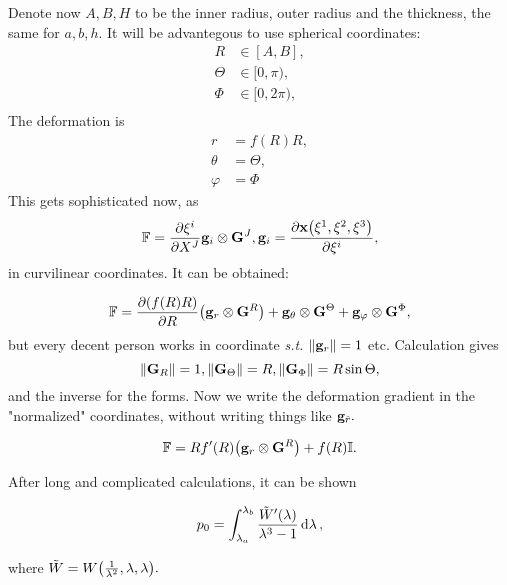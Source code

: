 \documentclass[reqno, a4paper]{article}
\begin{document}
Denote now $A,B,H$ to be the inner radius, outer radius and the thickness, the same for $a,b,h.$ It will be advantegous to use spherical coordinates:
\begin{align*}
	R &\in [A,B],\\
	\Theta &\in [0, \pi), \\
	\Phi &\in [0, 2 \pi), \\
\end{align*}
The deformation is 
\begin{align*}
	r &= f(R) R, \\
	\theta &= \Theta, \\
	\varphi &= \Phi
\end{align*}
This gets sophisticated now, as
\[
	\mathbb{F} = \pdv{\xi^i}{X^J}\vb{g}_i \otimes \vb{G}^J, \vb{g}_i = \pdv{\vb{x}\qty(\xi^1, \xi^2, \xi^3)}{\xi^i},
\]
in curvilinear coordinates. It can be obtained:

\[
	\mathbb{F} = \pdv{\qty(f(R)R)}{R} \qty(\vb{g}_r \otimes \vb{G}^R) + \vb{g}_{\theta}\otimes \vb{G}^{\Theta} + \vb{g}_{\varphi}\otimes \vb{G}^{\Phi},
\]
but every decent person works in coordinate \textit{s.t.} $\norm{\vb{g}_r} = 1$ etc. Calculation gives
\[
	\norm{\vb{G}_R} = 1, \norm{\vb{G}_{\Theta}} = R, \norm{\vb{G}_{\Phi}} = R \sin \Theta,
\]
and the inverse for the forms. Now we write the deformation gradient in the "normalized" coordinates, without writing things like $\vb{g}_{\hat{r}}.$

\[
	\mathbb{F} = R f'(R)\qty(\vb{g}_r \otimes \vb{G}^R)+ f(R)\mathbb{I}.
\]

After long and complicated calculations, it can be shown

\[
	p_0 = \int_{\lambda_a}^{\lambda_b} \frac{\tilde{W}'\qty(\lambda)}{\lambda^{3}-1} \dd{\lambda},
\]

where $\tilde{W} = W\qty(\frac{1}{\lambda^{2}}, \lambda, \lambda).$
\end{document}
